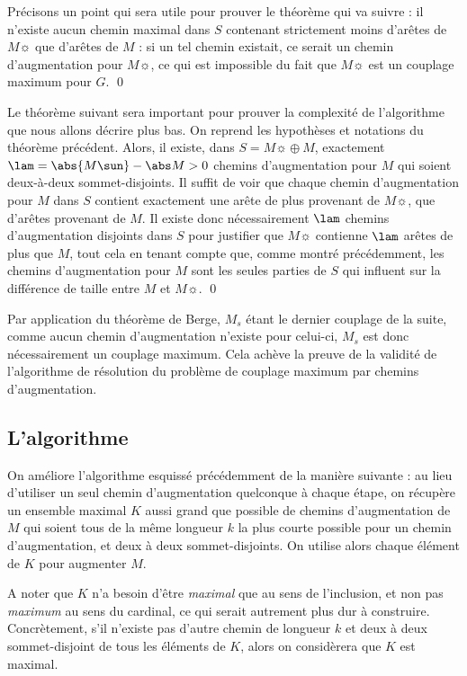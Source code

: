     Précisons un point qui sera utile pour prouver le théorème qui va suivre : il n'existe aucun chemin maximal dans $S$ contenant strictement moins d'arêtes de $M\sun$ que d'arêtes de $M$ : si un tel chemin existait, ce serait un chemin d'augmentation pour $M\sun$, ce qui est impossible du fait que $M\sun$ est un couplage maximum pour $G$.
 \qed\SEP
 
 Le théorème suivant sera important pour prouver la complexité de l'algorithme que nous allons décrire plus bas.
 \SEP{} On reprend les hypothèses et notations du théorème précédent. Alors, il existe, dans $S = M\sun \oplus M$, exactement $\lam = \abs {M\sun} - \abs M > 0$ chemins d'augmentation pour $M$ qui soient deux-à-deux sommet-disjoints.
 \SEP\jpreuve
    Il suffit de voir que chaque chemin d'augmentation pour $M$ dans $S$ contient exactement une arête de plus provenant de $M\sun$, que d'arêtes provenant de $M$. Il existe donc nécessairement $\lam$ chemins d'augmentation disjoints dans $S$ pour justifier que $M\sun$ contienne $\lam$ arêtes de plus que $M$, tout cela en tenant compte que, comme montré précédemment, les chemins d'augmentation pour $M$ sont les seules parties de $S$ qui influent sur la différence de taille entre $M$ et $M\sun$.
 \qed \SEP
 
 Par application du théorème de Berge, $M_s$ étant le dernier couplage de la suite, comme aucun chemin d'augmentation n'existe pour celui-ci, $M_s$ est donc nécessairement un couplage maximum. Cela achève la preuve de la validité de l'algorithme de résolution du problème de couplage maximum par chemins d'augmentation.
 
 \subsection{L'algorithme}
 
 On améliore l'algorithme esquissé précédemment de la manière suivante : au lieu d'utiliser un seul chemin d'augmentation quelconque à chaque étape, on récupère un ensemble maximal $K$ aussi grand que possible de chemins d'augmentation de $M$ qui soient tous de la même longueur $k$ la plus courte possible pour un chemin d'augmentation, et deux à deux sommet-disjoints. On utilise alors chaque élément de $K$ pour augmenter $M$.
 
 A noter que $K$ n'a besoin d'être \emph{maximal} que au sens de l'inclusion, et non pas \emph{maximum} au sens du cardinal, ce qui serait autrement plus dur à construire. Concrètement, s'il n'existe pas d'autre chemin de longueur $k$ et deux à deux sommet-disjoint de tous les éléments de $K$, alors on considèrera que $K$ est maximal.
 
